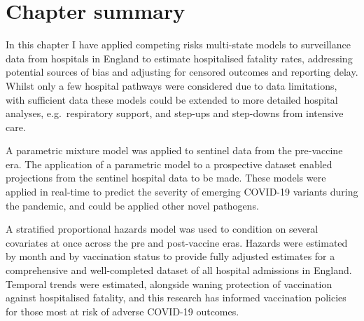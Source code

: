 \section{Chapter summary}

In this chapter I have applied competing risks multi-state models to surveillance data from hospitals in England to estimate hospitalised fatality rates, addressing potential sources of bias and adjusting for censored outcomes and reporting delay. Whilst only a few hospital pathways were considered due to data limitations, with sufficient data these models could be extended to more detailed hospital analyses, e.g.\ respiratory support, and step-ups and step-downs from intensive care.

A parametric mixture model was applied to sentinel data from the pre-vaccine era. The application of a parametric model to a prospective dataset enabled projections from the sentinel hospital data to be made. These models were applied in real-time to predict the severity of emerging COVID-19 variants during the pandemic, and could be applied other novel pathogens.

A stratified proportional hazards model was used to condition on several covariates at once across the pre and post-vaccine eras. Hazards were estimated by month and by vaccination status to provide fully adjusted estimates for a comprehensive and well-completed dataset of all hospital admissions in England. Temporal trends were estimated, alongside waning protection of vaccination against hospitalised fatality, and this research has informed vaccination policies for those most at risk of adverse COVID-19 outcomes.
